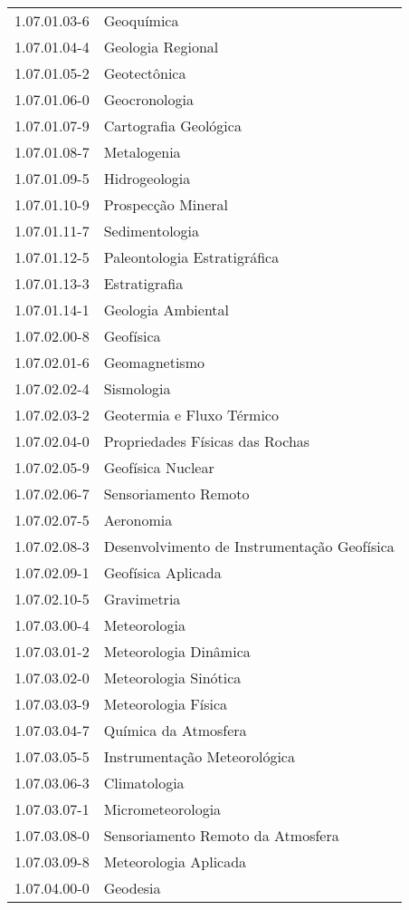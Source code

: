 \begin{longtable}[c]{p{2.15cm}p{13cm}}
1.07.01.03-6 & Geoquímica \\
1.07.01.04-4 & Geologia Regional \\
1.07.01.05-2 & Geotectônica \\
1.07.01.06-0 & Geocronologia \\
1.07.01.07-9 & Cartografia Geológica \\
1.07.01.08-7 & Metalogenia \\
1.07.01.09-5 & Hidrogeologia \\
1.07.01.10-9 & Prospecção Mineral \\
1.07.01.11-7 & Sedimentologia \\
1.07.01.12-5 & Paleontologia Estratigráfica \\
1.07.01.13-3 & Estratigrafia \\
1.07.01.14-1 & Geologia Ambiental \\
1.07.02.00-8 & Geofísica \\
1.07.02.01-6 & Geomagnetismo \\
1.07.02.02-4 & Sismologia \\
1.07.02.03-2 & Geotermia e Fluxo Térmico \\
1.07.02.04-0 & Propriedades Físicas das Rochas \\
1.07.02.05-9 & Geofísica Nuclear \\
1.07.02.06-7 & Sensoriamento Remoto \\
1.07.02.07-5 & Aeronomia \\
1.07.02.08-3 & Desenvolvimento de Instrumentação Geofísica \\
1.07.02.09-1 & Geofísica Aplicada \\
1.07.02.10-5 & Gravimetria \\
1.07.03.00-4 & Meteorologia \\
1.07.03.01-2 & Meteorologia Dinâmica \\
1.07.03.02-0 & Meteorologia Sinótica \\
1.07.03.03-9 & Meteorologia Física \\
1.07.03.04-7 & Química da Atmosfera \\
1.07.03.05-5 & Instrumentação Meteorológica \\
1.07.03.06-3 & Climatologia \\
1.07.03.07-1 & Micrometeorologia \\
1.07.03.08-0 & Sensoriamento Remoto da Atmosfera \\
1.07.03.09-8 & Meteorologia Aplicada \\
1.07.04.00-0 & Geodesia \\

\end{longtable}
